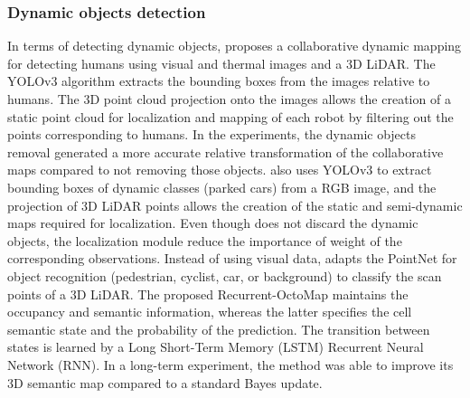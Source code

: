 \subsubsection{Dynamic objects detection}

In terms of detecting dynamic objects, \cite{yue-et-al:2020:9197072} proposes a collaborative dynamic mapping for detecting humans using visual and thermal images and a 3D LiDAR. The YOLOv3 algorithm extracts the bounding boxes from the images relative to humans. The 3D point cloud projection onto the images allows the creation of a static point cloud for localization and mapping of each robot by filtering out the points corresponding to humans. In the experiments, the dynamic objects removal generated a more accurate relative transformation of the collaborative maps compared to not removing those objects.
\cite{zhu-et-al:2021:9561584} also uses YOLOv3 to extract bounding boxes of dynamic classes (parked cars) from a RGB image, and the projection of 3D LiDAR points allows the creation of the static and semi-dynamic maps required for localization. Even though \cite{zhu-et-al:2021:9561584} does not discard the dynamic objects, the localization module reduce the importance of weight of the corresponding observations.
Instead of using visual data, \cite{sun-et-al:2018:2856268} adapts the PointNet for object recognition (pedestrian, cyclist, car, or background) to classify the scan points of a 3D LiDAR. The proposed Recurrent-OctoMap maintains the occupancy and semantic information, whereas the latter specifies the cell semantic state and the probability of the prediction. The transition between states is learned by a Long Short-Term Memory (LSTM) Recurrent Neural Network (RNN). In a long-term experiment, the method was able to improve its 3D semantic map compared to a standard Bayes update.

